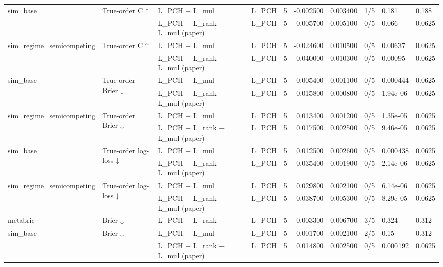 \begin{tabular}{llllrrrlll}
\cline{1-10} \cline{2-10}
\multirow[t]{2}{*}{sim\_base} & \multirow[t]{2}{*}{True-order C ↑} & L\_PCH + L\_mul & L\_PCH & 5 & -0.002500 & 0.003400 & 1/5 & 0.181 & 0.188 \\
 &  & L\_PCH + L\_rank + L\_mul (paper) & L\_PCH & 5 & -0.005700 & 0.005100 & 0/5 & 0.066 & 0.0625 \\
\cline{1-10} \cline{2-10}
\multirow[t]{2}{*}{sim\_regime\_semicompeting} & \multirow[t]{2}{*}{True-order C ↑} & L\_PCH + L\_mul & L\_PCH & 5 & -0.024600 & 0.010500 & 0/5 & 0.00637 & 0.0625 \\
 &  & L\_PCH + L\_rank + L\_mul (paper) & L\_PCH & 5 & -0.040000 & 0.010300 & 0/5 & 0.00095 & 0.0625 \\
\cline{1-10} \cline{2-10}
\multirow[t]{2}{*}{sim\_base} & \multirow[t]{2}{*}{True-order Brier ↓} & L\_PCH + L\_mul & L\_PCH & 5 & 0.005400 & 0.001100 & 0/5 & 0.000444 & 0.0625 \\
 &  & L\_PCH + L\_rank + L\_mul (paper) & L\_PCH & 5 & 0.015800 & 0.000800 & 0/5 & 1.94e-06 & 0.0625 \\
\cline{1-10} \cline{2-10}
\multirow[t]{2}{*}{sim\_regime\_semicompeting} & \multirow[t]{2}{*}{True-order Brier ↓} & L\_PCH + L\_mul & L\_PCH & 5 & 0.013400 & 0.001200 & 0/5 & 1.35e-05 & 0.0625 \\
 &  & L\_PCH + L\_rank + L\_mul (paper) & L\_PCH & 5 & 0.017500 & 0.002500 & 0/5 & 9.46e-05 & 0.0625 \\
\cline{1-10} \cline{2-10}
\multirow[t]{2}{*}{sim\_base} & \multirow[t]{2}{*}{True-order log-loss ↓} & L\_PCH + L\_mul & L\_PCH & 5 & 0.012500 & 0.002600 & 0/5 & 0.000438 & 0.0625 \\
 &  & L\_PCH + L\_rank + L\_mul (paper) & L\_PCH & 5 & 0.035400 & 0.001900 & 0/5 & 2.14e-06 & 0.0625 \\
\cline{1-10} \cline{2-10}
\multirow[t]{2}{*}{sim\_regime\_semicompeting} & \multirow[t]{2}{*}{True-order log-loss ↓} & L\_PCH + L\_mul & L\_PCH & 5 & 0.029800 & 0.002100 & 0/5 & 6.14e-06 & 0.0625 \\
 &  & L\_PCH + L\_rank + L\_mul (paper) & L\_PCH & 5 & 0.038700 & 0.005300 & 0/5 & 8.29e-05 & 0.0625 \\
\cline{1-10} \cline{2-10}
metabric & Brier ↓ & L\_PCH + L\_rank & L\_PCH & 5 & -0.003300 & 0.006700 & 3/5 & 0.324 & 0.312 \\
\cline{1-10} \cline{2-10}
\multirow[t]{2}{*}{sim\_base} & \multirow[t]{2}{*}{Brier ↓} & L\_PCH + L\_mul & L\_PCH & 5 & 0.001700 & 0.002100 & 2/5 & 0.15 & 0.312 \\
 &  & L\_PCH + L\_rank + L\_mul (paper) & L\_PCH & 5 & 0.014800 & 0.002500 & 0/5 & 0.000192 & 0.0625 \\

\end{tabular}
